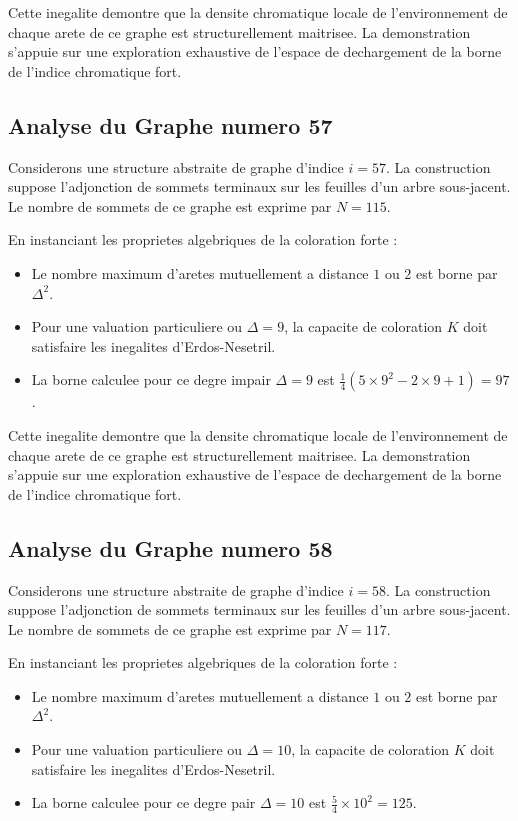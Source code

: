 \documentclass[11pt,a4paper]{article}
\begin{document}
Cette inegalite demontre que la densite chromatique locale de l'environnement de chaque arete de ce graphe est structurellement maitrisee. La demonstration s'appuie sur une exploration exhaustive de l'espace de dechargement de la borne de l'indice chromatique fort.

\subsection{Analyse du Graphe numero 57}
Considerons une structure abstraite de graphe d'indice $i = 57$. La construction suppose l'adjonction de sommets terminaux sur les feuilles d'un arbre sous-jacent. Le nombre de sommets de ce graphe est exprime par $N = 115$.

En instanciant les proprietes algebriques de la coloration forte :
\begin{itemize}
\item Le nombre maximum d'aretes mutuellement a distance $1$ ou $2$ est borne par $\Delta^2$.
\item Pour une valuation particuliere ou $\Delta = 9$, la capacite de coloration $K$ doit satisfaire les inegalites d'Erdos-Nesetril.
\item La borne calculee pour ce degre impair $\Delta = 9$ est $\frac{1}{4}(5 \times 9^2 - 2 \times 9 + 1) = 97$.
\end{itemize}

Cette inegalite demontre que la densite chromatique locale de l'environnement de chaque arete de ce graphe est structurellement maitrisee. La demonstration s'appuie sur une exploration exhaustive de l'espace de dechargement de la borne de l'indice chromatique fort.

\subsection{Analyse du Graphe numero 58}
Considerons une structure abstraite de graphe d'indice $i = 58$. La construction suppose l'adjonction de sommets terminaux sur les feuilles d'un arbre sous-jacent. Le nombre de sommets de ce graphe est exprime par $N = 117$.

En instanciant les proprietes algebriques de la coloration forte :
\begin{itemize}
\item Le nombre maximum d'aretes mutuellement a distance $1$ ou $2$ est borne par $\Delta^2$.
\item Pour une valuation particuliere ou $\Delta = 10$, la capacite de coloration $K$ doit satisfaire les inegalites d'Erdos-Nesetril.
\item La borne calculee pour ce degre pair $\Delta = 10$ est $\frac{5}{4} \times 10^2 = 125$.
\end{itemize}
\end{document}
